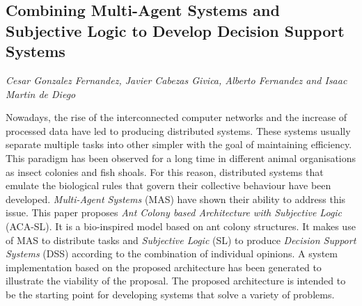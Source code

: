 \documentclass[../booklet.tex]{subfiles}
\begin{document}
\subsection[Combining Multi-Agent Systems and Subjective Logic to Develop Decision Support Systems. {\it Cesar Gonzalez Fernandez, Javier Cabezas Givica, Alberto Fernandez and Isaac Martin de Diego}]{Combining Multi-Agent Systems and Subjective Logic to Develop Decision Support Systems}
   

\begin{center}
  {\it Cesar Gonzalez Fernandez, Javier Cabezas Givica, Alberto Fernandez and Isaac Martin de Diego}
\end{center}

\vskip 0.8cm

Nowadays, the rise of the interconnected computer networks and the increase of processed data have led to producing distributed systems. These systems usually separate multiple tasks into other simpler with the goal of maintaining efficiency. This paradigm has been observed for a long time in different animal organisations as insect colonies and fish shoals. For this reason, distributed systems that emulate the biological rules that govern their collective behaviour have been developed. \emph{Multi-Agent Systems} (MAS) have shown their ability to address this issue. This paper proposes \emph{Ant Colony based Architecture with Subjective Logic} (ACA-SL). It is a bio-inspired model based on ant colony structures. It makes use of MAS to distribute tasks and \emph{Subjective Logic} (SL) to produce \emph{Decision Support Systems} (DSS) according to the combination of individual opinions. A system implementation based on the proposed architecture has been generated to illustrate the viability of the proposal. The proposed architecture is intended to be the starting point for developing systems that solve a variety of problems.

\end{document}
